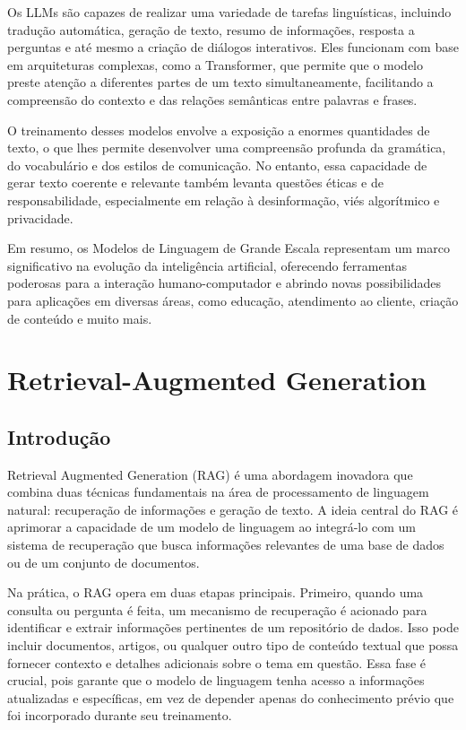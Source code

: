 \documentclass[14pt,a4paper,oneside]{book}
\begin{document}
Os LLMs são capazes de realizar uma variedade de tarefas linguísticas, incluindo tradução automática, geração de texto, resumo de informações, resposta a perguntas e até mesmo a criação de diálogos interativos. Eles funcionam com base em arquiteturas complexas, como a Transformer, que permite que o modelo preste atenção a diferentes partes de um texto simultaneamente, facilitando a compreensão do contexto e das relações semânticas entre palavras e frases.

O treinamento desses modelos envolve a exposição a enormes quantidades de texto, o que lhes permite desenvolver uma compreensão profunda da gramática, do vocabulário e dos estilos de comunicação. No entanto, essa capacidade de gerar texto coerente e relevante também levanta questões éticas e de responsabilidade, especialmente em relação à desinformação, viés algorítmico e privacidade.

Em resumo, os Modelos de Linguagem de Grande Escala representam um marco significativo na evolução da inteligência artificial, oferecendo ferramentas poderosas para a interação humano-computador e abrindo novas possibilidades para aplicações em diversas áreas, como educação, atendimento ao cliente, criação de conteúdo e muito mais.


\chapter{Retrieval-Augmented Generation}

\section{Introdução}

Retrieval Augmented Generation (RAG) é uma abordagem inovadora que combina duas técnicas fundamentais na área de processamento de linguagem natural: recuperação de informações e geração de texto. A ideia central do RAG é aprimorar a capacidade de um modelo de linguagem ao integrá-lo com um sistema de recuperação que busca informações relevantes de uma base de dados ou de um conjunto de documentos.

Na prática, o RAG opera em duas etapas principais. Primeiro, quando uma consulta ou pergunta é feita, um mecanismo de recuperação é acionado para identificar e extrair informações pertinentes de um repositório de dados. Isso pode incluir documentos, artigos, ou qualquer outro tipo de conteúdo textual que possa fornecer contexto e detalhes adicionais sobre o tema em questão. Essa fase é crucial, pois garante que o modelo de linguagem tenha acesso a informações atualizadas e específicas, em vez de depender apenas do conhecimento prévio que foi incorporado durante seu treinamento.
\end{document}
